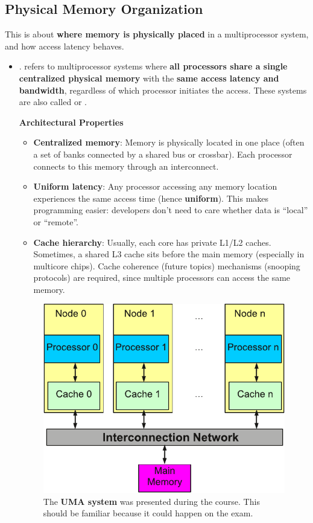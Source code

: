 \subsection{Physical Memory Organization}

This is about \textbf{where memory is physically placed} in a multiprocessor system, and how access latency behaves.

\begin{itemize}
    \item {}.  refers to multiprocessor systems where \textbf{all processors share a single centralized physical memory} with the \textbf{same access latency and bandwidth}, regardless of which processor initiates the access. These systems are also called  or .
    
    \textcolor{Green3}{ \textbf{Architectural Properties}}
    \begin{itemize}
        \item \textbf{Centralized memory}: Memory is physically located in one place (often a set of banks connected by a shared bus or crossbar). Each processor connects to this memory through an interconnect.
        \item \textbf{Uniform latency}: Any processor accessing any memory location experiences the same access time (hence \textbf{uniform}). This makes programming easier: developers don't need to care whether data is ``local'' or ``remote''.
        \item \textbf{Cache hierarchy}: Usually, each core has private L1/L2 caches. Sometimes, a shared L3 cache sits before the main memory (especially in multicore chips). Cache coherence (future topics) mechanisms (snooping protocols) are required, since multiple processors can access the same memory.
    \end{itemize}

    \begin{figure}[!htp]
        \centering
        \includegraphics[width=.65\textwidth]{img/uma-polimi.pdf}
        \caption{The \textbf{UMA system} was presented during the course. This should be familiar because it could happen on the exam.\cite{course-slides-polimi}}
    \end{figure}


\end{itemize}
